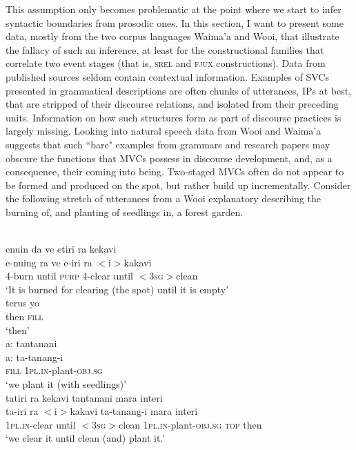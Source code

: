 This assumption only becomes problematic at the point where we start to infer syntactic boundaries from prosodic ones. In this section, I want to present some data, mostly from the two corpus languages Waima'a and Wooi, that illustrate the fallacy of such an inference, at least for the constructional families that correlate two event stages (that is, \textsc{srel} and \textsc{fjux} constructions). Data from published sources seldom contain contextual information. Examples of SVCs presented in grammatical descriptions are often chunks of utterances, IPs at best, that are stripped of their discourse relations, and isolated from their preceding units. Information on how such structures form as part of discourse practices is largely missing. Looking into natural speech data from Wooi and Waima'a suggests that such ``bare" examples from grammars and research papers may obscure the functions that MVCs possess in discourse development, and, as a consequence, their coming into being. Two-staged MVCs often do not appear to be formed and produced on the spot, but rather build up incrementally. Consider the following stretch of utterances from a Wooi explanatory describing the burning of, and planting of seedlings in, a forest garden.  

\ea \label{Wooi_gardening1}
\\
\ea 
\glll enuin da ve etiri ra kekavi \\
e-nuing ra ve e-iri ra $<$i$>$kakavi \\
\textsc{4}-burn until \textsc{purp} \textsc{4}-clear until $<$\textsc{3}\textsc{sg}$>$clean \\
\glft `It is burned for clearing (the spot) until it is empty' \\ 
\ex
\gll terus yo \\
then \textsc{fill} \\
\glft `then' \\ 
\ex
\glll a: tantanani \\
a: ta-tanang-i \\
\textsc{fill} \textsc{1}\textsc{pl}.\textsc{in}-plant-\textsc{obj}.\textsc{sg} \\
\glft `we plant it (with seedlings)' \\ 
\ex
\glll tatiri ra kekavi tantanani mara interi \\ 
ta-iri ra $<$i$>$kakavi ta-tanang-i mara interi \\
\textsc{1}\textsc{pl}.\textsc{in}-clear until $<$\textsc{3}\textsc{sg}$>$clean \textsc{1}\textsc{pl}.\textsc{in}-plant-\textsc{obj}.\textsc{sg} \textsc{top} then \\
\glft `we clear it until clean (and) plant it.'\\ 
\z
\z

